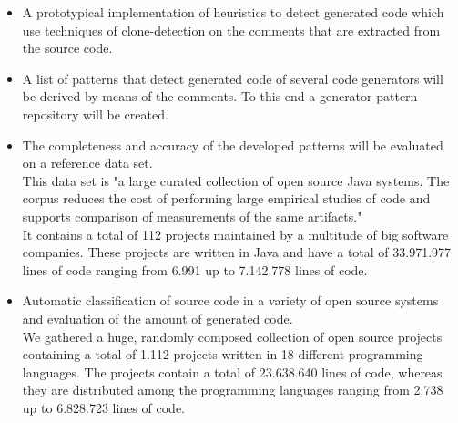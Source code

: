 \begin{itemize}
	\item A prototypical implementation of heuristics to detect generated code which use techniques of clone-detection on the comments that are extracted from the source code.
	\item A list of patterns that detect generated code of several code generators will be derived by means of the comments. To this end a generator-pattern repository will be created.
	\item The completeness and accuracy of the developed patterns will be evaluated on a reference data set.\\
	This data set is "a large curated collection of open source Java systems. The corpus reduces the cost of performing
	large empirical studies of code and supports comparison of measurements of the same artifacts."\cite[p.~1]{TemperoEwanandAnslowCraigandDietrichJensandHanTedandLiJingandLumpeMarkusandMeltonHaydenandNoble2010a}\\
	It contains a total of 112 projects maintained by a multitude of big software companies. These projects are written in Java and have a total of 33.971.977 lines of code ranging from 6.991 up to 7.142.778 lines of code.
	\item Automatic classification of source code in a variety of open source systems and evaluation of the amount of generated code.\\
	We gathered a huge, randomly composed collection of open source projects containing a total of 1.112 projects written in 18 different programming languages. The projects contain a total of 23.638.640 lines of code, whereas they are distributed among the programming languages ranging from 2.738 up to 6.828.723 lines of code. 
\end{itemize}